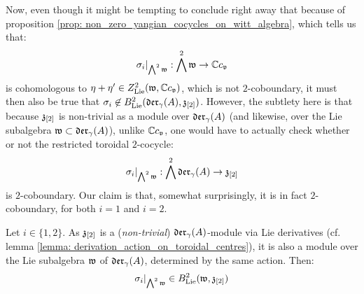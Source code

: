         Now, even though it might be tempting to conclude right away that because of proposition \ref{prop: non_zero_yangian_cocycles_on_witt_algebra}, which tells us that:
            $$\sigma_i|_{\bigwedge^2 \mathfrak{w}}: \bigwedge^2 \mathfrak{w} \to \mathbb{C} c_{\mathfrak{v}}$$
        is cohomologous to $\eta + \eta' \in Z^2_{\mathrm{Lie}}(\mathfrak{w}, \mathbb{C} c_{\mathfrak{v}})$, which is not $2$-coboundary, it must then also be true that $\sigma_i \not \in B^2_{\mathrm{Lie}}(\mathfrak{der}_{\gamma}(A), \mathfrak{z}_{[2]})$. However, the subtlety here is that because $\mathfrak{z}_{[2]}$ is non-trivial as a module over $\mathfrak{der}_{\gamma}(A)$ (and likewise, over the Lie subalgebra $\mathfrak{w} \subset \mathfrak{der}_{\gamma}(A)$), unlike $\mathbb{C} c_{\mathfrak{v}}$, one would have to actually check whether or not the restricted toroidal $2$-cocycle:
            $$\sigma_i|_{\bigwedge^2 \mathfrak{w}}: \bigwedge^2 \mathfrak{der}_{\gamma}(A) \to \mathfrak{z}_{[2]}$$
        is $2$-coboundary. Our claim is that, somewhat surprisingly, it is in fact $2$-coboundary, for both $i = 1$ and $i = 2$.
        \begin{proposition} \label{prop: non_trivial_yangian_restricted_coboundaries_examples}
            Let $i \in \{1, 2\}$. As $\mathfrak{z}_{[2]}$ is a (\textit{non-trivial}) $\mathfrak{der}_{\gamma}(A)$-module via Lie derivatives (cf. lemma \ref{lemma: derivation_action_on_toroidal_centres}), it is also a module over the Lie subalgebra $\mathfrak{w}$ of $\mathfrak{der}_{\gamma}(A)$, determined by the same action. Then:
                $$\sigma_i|_{ \bigwedge^2 \mathfrak{w} } \in B^2_{\mathrm{Lie}}(\mathfrak{w}, \mathfrak{z}_{[2]})$$
        \end{proposition}
